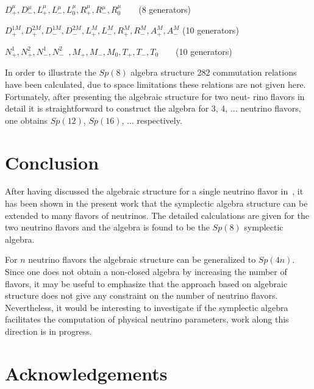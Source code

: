 \documentclass[a4paper,12pt]{article}
\begin{document}
\qquad $D_{+}^{\mu },D_{-}^{\mu
},L_{+}^{\mu },L_{-}^{\mu },L_{0}^{\mu },R_{+}^{\mu },R_{-}^{\mu
},R_{0}^{\mu }\qquad $(8 generators)\vspace{8pt}

\qquad $D_{+}^{1M},D_{+}^{2M},D_{-}^{1M},D_{-}^{2M},L_{+}^{M},L_{-}^{M},R_{+}^{M},R_{-}^{M},A_{+}^{M},A_{-}^{M}$ \qquad (10 generators)\vspace{8pt}

\qquad $N_{+}^{1},N_{+}^{2},N_{-}^{1},N_{-}^{2}$\ $%
,M_{+},M_{-},M_{0},T_{+},T_{-},T_{0}\qquad $(10 generators)
\vspace{8pt}

In order to illustrate the $Sp(8)$ algebra structure 282 commutation 
relations have been calculated, due to space limitations these relations 
are not given here. 
Fortunately, after presenting the algebraic structure for two neut- rino 
flavors in detail it is straightforward to construct the algebra for 
3, 4, ... neutrino flavors, one obtains $Sp(12)$, $Sp(16)$, ... respectively.
\section{Conclusion}
After having discussed the algebraic structure for a single neutrino flavor 
in~\cite{baha},
it has been shown in the present work that the symplectic algebra structure 
can be extended to many flavors of neutrinos. The detailed calculations 
are given for the two neutrino flavors and the algebra is found to be the 
$Sp(8)$ symplectic algebra. 

For $n$ neutrino flavors the algebraic 
structure can be generalized to $Sp(4n)$. Since one does not obtain a 
non-closed algebra 
by increasing the number of flavors, it may be useful to emphasize that 
the approach based on algebraic structure does not give 
any constraint on the number of neutrino flavors. Nevertheless, it 
would be interesting to investigate if the symplectic algebra 
facilitates the computation of physical neutrino parameters, 
work along this direction is in progress.

\section*{Acknowledgements}
\end{document}
